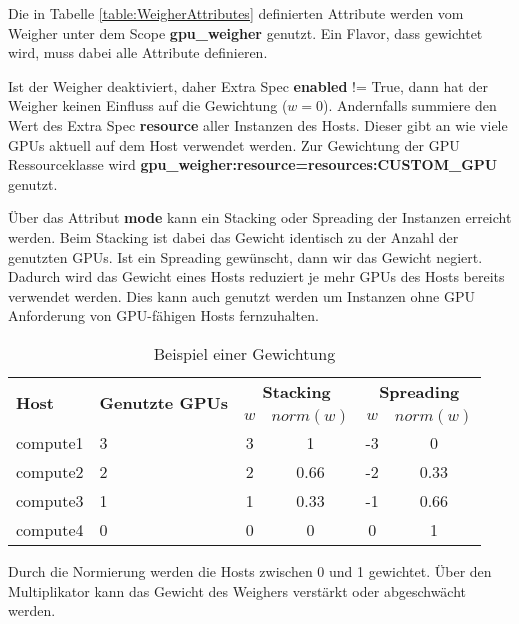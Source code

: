 \documentclass[../Main.tex]{subfiles}
\begin{document}
Die in Tabelle \ref{table:WeigherAttributes} definierten Attribute werden vom Weigher
unter dem Scope \textbf{gpu\_weigher} genutzt. Ein Flavor, dass gewichtet wird, muss dabei alle Attribute
definieren.

Ist der Weigher deaktiviert, daher Extra Spec \textbf{enabled} != True, dann hat der Weigher keinen Einfluss auf die Gewichtung ($w = 0$).
Andernfalls summiere den Wert des Extra Spec \textbf{resource} aller Instanzen des Hosts. Dieser gibt
an wie viele GPUs aktuell auf dem Host verwendet werden. Zur Gewichtung der GPU Ressourceklasse wird \textbf{gpu\_weigher:resource=resources:CUSTOM\_GPU}
genutzt.

Über das Attribut \textbf{mode} kann ein Stacking oder Spreading der Instanzen erreicht werden. Beim Stacking
ist dabei das Gewicht identisch zu der Anzahl der genutzten GPUs. Ist ein Spreading gewünscht,
dann wir das Gewicht negiert. Dadurch wird das Gewicht eines Hosts reduziert je mehr GPUs des Hosts bereits
verwendet werden. Dies kann auch genutzt werden um Instanzen ohne GPU Anforderung von GPU-fähigen Hosts fernzuhalten.

\begin{table}[H]
  \centering
  \caption{Beispiel einer Gewichtung}
  \renewcommand{\arraystretch}{1.2}
  \begin{tabular}{|p{3cm}|p{4cm}|c|c|c|c|}
    \hline
    \multirow{2}{3cm}{\textbf{Host}} & \multirow{2}{4cm}{\textbf{Genutzte GPUs}} & \multicolumn{2}{c|}{\textbf{Stacking}} & \multicolumn{2}{c|}{\textbf{Spreading}} \\
    \cline{3-6}
    & & \textbf{$w$} & \textbf{$norm(w)$} & \textbf{$w$} & \textbf{$norm(w)$} \\
    \hline
    compute1 & 3 & 3 & 1\phantom{.00} & -3 & 0\phantom{.00} \\ \hline
    compute2 & 2 & 2 & 0.66 & -2 & 0.33 \\ \hline
    compute3 & 1 & 1 & 0.33 & -1 & 0.66 \\ \hline
    compute4 & 0 & 0 & 0\phantom{.00} & \phantom{-}0 & 1\phantom{.00} \\ \hline
  \end{tabular}
  \label{table:WeighingExample}
\end{table}

Durch die Normierung werden die Hosts zwischen 0 und 1 gewichtet. Über den Multiplikator kann das Gewicht
des Weighers verstärkt oder abgeschwächt werden.

\biblio %
\end{document}
